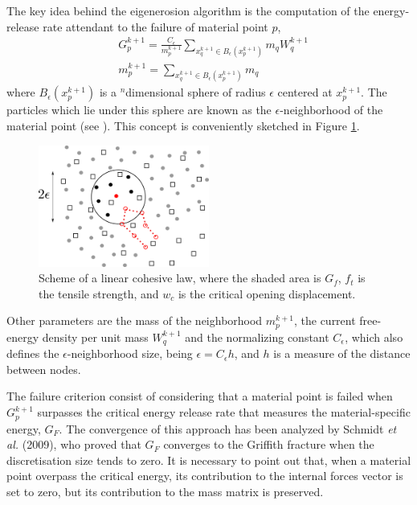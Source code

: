 \documentclass[preprint,12pt,a4paper]{elsarticle}
\begin{document}
The key idea behind the eigenerosion algorithm is the computation of the
energy-release rate attendant to the failure of material point $p$,
\begin{align}
  \label{eq:energy-release-EE}
&G_p^{k+1} = \frac{C_{\epsilon}}{m_p^{k+1}}  \sum_{x_q^{k+1} \in
  B_{\epsilon}(x_p^{k+1})} m_q W_q^{k+1}\\
  \label{eq:mass-EE}
&m_p^{k+1} =  \sum_{x_q^{k+1} \in
  B_{\epsilon}(x_p^{k+1})} m_q  
\end{align}
where $B_{\epsilon}(x_p^{k+1})$ is a $^n$dimensional sphere of radius $\epsilon$
centered at $x_p^{k+1}$. The particles which lie under this sphere are
known as the $\epsilon$-neighborhood of the material point (see
\cite{Pandolfi_2012}). This concept is conveniently sketched in
Figure \ref{fig:Failed-particles}.
\begin{figure}
  \centering
  \includegraphics[width=0.5\textwidth]{Figure-Particle-failed}
  \caption{Scheme of a linear cohesive law, where the shaded area is
    $G_f$, $f_t$ is the tensile strength, and $w_c$ is the critical
    opening displacement.}
  \label{fig:Failed-particles}
\end{figure}
Other parameters are the mass of the neighborhood $m_p^{k+1}$, the
current free-energy density per unit mass  $W_q^{k+1}$ and the
normalizing constant $C_{\epsilon}$, which also defines the
  $\epsilon$-neighborhood size, being $\epsilon = C_\epsilon h$, and
  $h$ is a measure of the distance between nodes.

The failure criterion consist of considering that a material point is failed
when $G_p^{k+1}$ surpasses the critical energy release rate that
measures the material-specific energy, $G_F$. The convergence of this
approach has been analyzed by Schmidt {\it et al.}
(2009)\cite{Schmidt_2009}, who proved that $G_F$ converges to the Griffith
fracture when the discretisation size tends to zero. It is necessary to
point out that, when a material point overpass the critical energy, its
contribution to the internal forces vector is set to zero, but its
contribution to the mass matrix is preserved.\\
\end{document}
